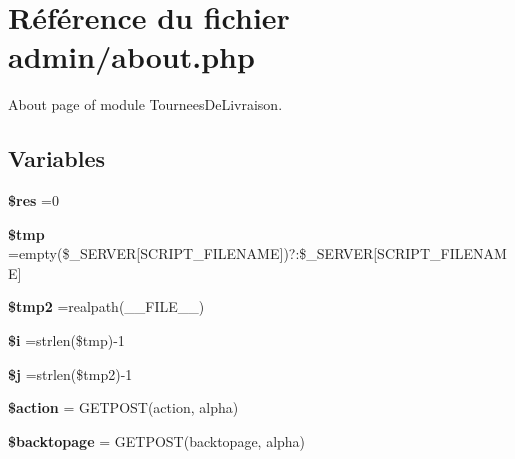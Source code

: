 \hypertarget{about_8php}{}\section{Référence du fichier admin/about.php}
\label{about_8php}


About page of module Tournees\+De\+Livraison.  


\subsection*{Variables}
\begin{DoxyCompactItemize}
\item 
\mbox{\label{about_8php_a49a8a4009b02e49717caa88b128affc5}} 
{\bfseries \$res} =0
\item 
\mbox{\label{about_8php_a57024d47cf8348153f5fdda16f8fefa9}} 
{\bfseries \$tmp} =empty(\$\+\_\+\+S\+E\+R\+V\+ER\mbox{[}\textquotesingle{}S\+C\+R\+I\+P\+T\+\_\+\+F\+I\+L\+E\+N\+A\+ME\textquotesingle{}\mbox{]})?\textquotesingle{}\textquotesingle{}\+:\$\+\_\+\+S\+E\+R\+V\+ER\mbox{[}\textquotesingle{}S\+C\+R\+I\+P\+T\+\_\+\+F\+I\+L\+E\+N\+A\+ME\textquotesingle{}\mbox{]}
\item 
\mbox{\label{about_8php_aed9bcb6730d1510376ce80e32bd9504d}} 
{\bfseries \$tmp2} =realpath(\+\_\+\+\_\+\+F\+I\+L\+E\+\_\+\+\_\+)
\item 
\mbox{\label{about_8php_a83018d9153d17d91fbcf3bc10158d34f}} 
{\bfseries \$i} =strlen(\$tmp)-\/1
\item 
\mbox{\label{about_8php_a6f16db779ef3ccea921b277b5dc245d1}} 
{\bfseries \$j} =strlen(\$tmp2)-\/1
\item 
\mbox{\label{about_8php_aa698a3e72116e8e778be0e95d908ee30}} 
{\bfseries \$action} = G\+E\+T\+P\+O\+ST(\textquotesingle{}action\textquotesingle{}, \textquotesingle{}alpha\textquotesingle{})
\item 
\mbox{\label{about_8php_a71552e61097747f0d8e8288daf9be44d}} 
{\bfseries \$backtopage} = G\+E\+T\+P\+O\+ST(\textquotesingle{}backtopage\textquotesingle{}, \textquotesingle{}alpha\textquotesingle{})
\item 

\end{DoxyCompactItemize}
